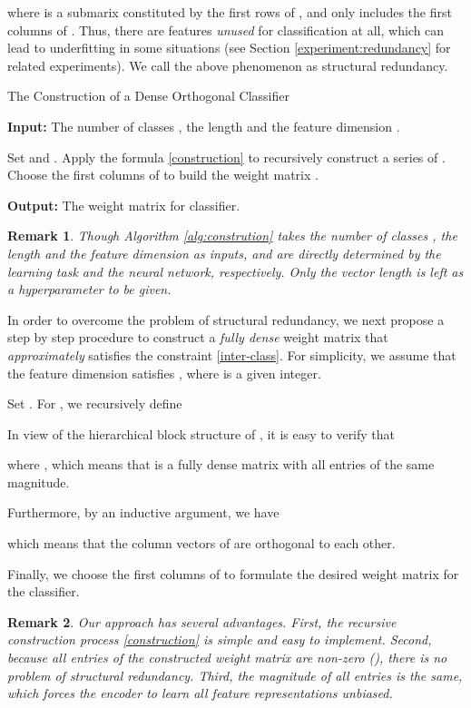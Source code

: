 \documentclass[preprint,review,12pt]{elsarticle}
\newtheorem{rmrk}{Remark}
\numberwithin{equation}{section}
\begin{document}
where  is a submarix constituted by the first  rows of ,
and  only includes the first   columns of .
Thus, there are   features \emph{ unused} for classification at all,
which can lead to underfitting  in some situations (see Section \ref{experiment:redundancy} for related experiments).
We call the above phenomenon as structural redundancy.
	
	\begin{algorithm}[htb]
   		\caption{The Construction of a Dense Orthogonal Classifier}
        \label{alg:constrution}
		{\bf Input:}  The number of classes ,  the length  and the feature dimension .
		\begin{algorithmic}
			\State Set  and .
			\For{}
			\State Apply the formula \eqref{construction} to recursively construct a series of .
			\EndFor
			\State Choose the first  columns of   to build the weight matrix .
		\end{algorithmic}
		{\bf Output:} The weight matrix  for classifier.
	\end{algorithm}


\begin{rmrk}
	Though Algorithm \ref{alg:constrution} takes the number of classes , the length  and the feature dimension  as inputs,
	 and  are directly determined by the learning task and the neural network, respectively.
	Only the vector length   is left as a hyperparameter to be given.
\end{rmrk}

	
In order to overcome the problem of structural redundancy,
we next propose a step by step procedure to construct a \textit{fully dense} weight matrix 
that \textit{approximately} satisfies the constraint \eqref{inter-class}.
For simplicity,  we assume that the feature dimension satisfies , where  is a given integer.

Set .	For , we recursively define
	
 In view of the hierarchical block structure of  ,
it is easy to verify that
 
where ,
which means that  is a fully dense matrix with all entries of the same magnitude.

Furthermore, by an inductive argument, we have
	
which means that the column vectors of  are orthogonal to each other.
	
Finally,  we choose the first  columns of  to formulate the  desired weight matrix  for the classifier.


\begin{rmrk}
    Our approach has several advantages.
    First, the recursive construction process \eqref{construction} is simple and easy to implement.
    Second, because all entries of the constructed weight matrix are non-zero (),
    there is no problem of structural redundancy.
    Third, the magnitude of all entries is the same, which forces the encoder to learn all feature representations unbiased.
\end{rmrk}
\end{document}
